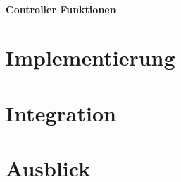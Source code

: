 \paragraph{Controller Funktionen}
\section{Implementierung}
\section{Integration}
\section{Ausblick}
